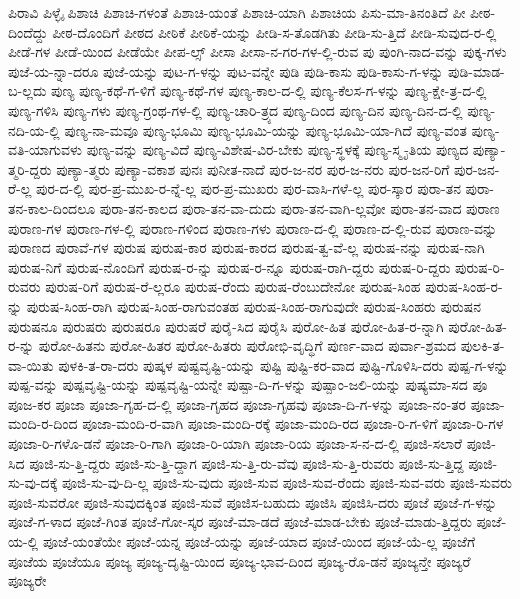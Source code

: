 {ಪಿರಾವಿ
ಪಿಳ್ಳೈ
ಪಿಶಾಚಿ
ಪಿಶಾಚಿ-ಗಳಂತೆ
ಪಿಶಾಚಿ-ಯಂತೆ
ಪಿಶಾಚಿ-ಯಾಗಿ
ಪಿಶಾಚಿಯ
ಪಿಸು-ಮಾ-ತಿನಂತಿದೆ
ಪೀ
ಪೀಠ-ದಿಂದೆದ್ದು
ಪೀಠ-ದೊಂದಿಗೆ
ಪೀಠದ
ಪೀಠಿಕೆ
ಪೀಠಿಕೆ-ಯನ್ನು
ಪೀಡಿ-ಸ-ತೊಡಗಿತು
ಪೀಡಿ-ಸು-ತ್ತಿದೆ
ಪೀಡಿ-ಸುವುದ-ರ-ಲ್ಲಿ
ಪೀಡೆ-ಗಳ
ಪೀಡೆ-ಯಿಂದ
ಪೀಡೆಯೇ
ಪೀಪ-ಲ್ಸ್
ಪೀಸಾ
ಪೀಸಾ-ನ-ಗರ-ಗಳ-ಲ್ಲಿ-ರುವ
ಪು
ಪುಂಗಿ-ನಾದ-ವನ್ನು
ಪುಕ್ಕ-ಗಳು
ಪುಜೆ-ಯ-ನ್ನಾ-ದರೂ
ಪುಜೆ-ಯನ್ನು
ಪುಟ-ಗ-ಳನ್ನು
ಪುಟ-ವನ್ನೇ
ಪುಡಿ
ಪುಡಿ-ಕಾಸು
ಪುಡಿ-ಕಾಸು-ಗ-ಳನ್ನು
ಪುಡಿ-ಮಾಡ-ಬ-ಲ್ಲದು
ಪುಣ್ಯ
ಪುಣ್ಯ-ಕಥೆ-ಗ-ಳಿಗೆ
ಪುಣ್ಯ-ಕಥೆ-ಗಳ
ಪುಣ್ಯ-ಕಾಲ-ದ-ಲ್ಲಿ
ಪುಣ್ಯ-ಕೆಲಸ-ಗ-ಳನ್ನು
ಪುಣ್ಯ-ಕ್ಷೇ-ತ್ರ-ದ-ಲ್ಲಿ
ಪುಣ್ಯ-ಗಳಿಸಿ
ಪುಣ್ಯ-ಗಳು
ಪುಣ್ಯ-ಗ್ರಂಥ-ಗಳ-ಲ್ಲಿ
ಪುಣ್ಯ-ಚಾರಿ-ತ್ರ್ಯದ
ಪುಣ್ಯ-ದಿಂದ
ಪುಣ್ಯ-ದಿನ
ಪುಣ್ಯ-ದಿನ-ದ-ಲ್ಲಿ
ಪುಣ್ಯ-ನದಿ-ಯ-ಲ್ಲಿ
ಪುಣ್ಯ-ನಾ-ಮವೂ
ಪುಣ್ಯ-ಭೂಮಿ
ಪುಣ್ಯ-ಭೂಮಿ-ಯನ್ನು
ಪುಣ್ಯ-ಭೂಮಿ-ಯಾ-ಗಿದೆ
ಪುಣ್ಯ-ವಂತ
ಪುಣ್ಯ-ವತಿ-ಯಾಗುವಳು
ಪುಣ್ಯ-ವನ್ನು
ಪುಣ್ಯ-ವಿದೆ
ಪುಣ್ಯ-ವಿಶೇಷ-ವಿರ-ಬೇಕು
ಪುಣ್ಯ-ಸ್ಥಳಕ್ಕೆ
ಪುಣ್ಯ-ಸ್ಮೃ-ತಿಯ
ಪುಣ್ಯದ
ಪುಣ್ಯಾ-ತ್ಮರಿ-ದ್ದರು
ಪುಣ್ಯಾ-ತ್ಮರು
ಪುಣ್ಯಾ-ವಕಾಶ
ಪುನಃ
ಪುನೀತ-ನಾದೆ
ಪುರ-ಜ-ನರ
ಪುರ-ಜ-ನರು
ಪುರ-ಜನ-ರಿಗೆ
ಪುರ-ಜನ-ರೆ-ಲ್ಲ
ಪುರ-ದ-ಲ್ಲಿ
ಪುರ-ಪ್ರ-ಮುಖ-ರ-ನ್ನೆ-ಲ್ಲ
ಪುರ-ಪ್ರ-ಮುಖರು
ಪುರ-ವಾಸಿ-ಗಳೆ-ಲ್ಲ
ಪುರ-ಸ್ಕಾರ
ಪುರಾ-ತನ
ಪುರಾ-ತನ-ಕಾಲ-ದಿಂದಲೂ
ಪುರಾ-ತನ-ಕಾಲದ
ಪುರಾ-ತನ-ವಾ-ದುದು
ಪುರಾ-ತನ-ವಾಗಿ-ಲ್ಲವೋ
ಪುರಾ-ತನ-ವಾದ
ಪುರಾಣ
ಪುರಾಣ-ಗಳ
ಪುರಾಣ-ಗಳ-ಲ್ಲಿ
ಪುರಾಣ-ಗಳಿಂದ
ಪುರಾಣ-ಗಳು
ಪುರಾಣ-ದ-ಲ್ಲಿ
ಪುರಾಣ-ದ-ಲ್ಲಿ-ರುವ
ಪುರಾಣ-ವನ್ನು
ಪುರಾಣದ
ಪುರಾವೆ-ಗಳ
ಪುರುಷ
ಪುರುಷ-ಕಾರ
ಪುರುಷ-ಕಾರದ
ಪುರುಷ-ತ್ವ-ವೆ-ಲ್ಲ
ಪುರುಷ-ನನ್ನು
ಪುರುಷ-ನಾಗಿ
ಪುರುಷ-ನಿಗೆ
ಪುರುಷ-ನೊಂದಿಗೆ
ಪುರುಷ-ರ-ನ್ನು
ಪುರುಷ-ರ-ನ್ನೂ
ಪುರುಷ-ರಾಗಿ-ದ್ದರು
ಪುರುಷ-ರಿ-ದ್ದರು
ಪುರುಷ-ರಿ-ರುವರು
ಪುರುಷ-ರಿಗೆ
ಪುರುಷ-ರೆ-ಲ್ಲರೂ
ಪುರುಷ-ರೆಂದು
ಪುರುಷ-ರೆಂಬುದೇನೋ
ಪುರುಷ-ಸಿಂಹ
ಪುರುಷ-ಸಿಂಹ-ರ-ನ್ನು
ಪುರುಷ-ಸಿಂಹ-ರಾಗಿ
ಪುರುಷ-ಸಿಂಹ-ರಾಗುವಂತಹ
ಪುರುಷ-ಸಿಂಹ-ರಾಗುವುದೇ
ಪುರುಷ-ಸಿಂಹರು
ಪುರುಷನ
ಪುರುಷನೂ
ಪುರುಷರು
ಪುರುಷರೂ
ಪುರುಷರೆ
ಪುರೈ-ಸಿದ
ಪುರೈಸಿ
ಪುರೋ-ಹಿತ
ಪುರೋ-ಹಿತ-ರ-ನ್ನಾಗಿ
ಪುರೋ-ಹಿತ-ರ-ನ್ನು
ಪುರೋ-ಹಿತನು
ಪುರೋ-ಹಿತರ
ಪುರೋ-ಹಿತರು
ಪುರೋಭಿ-ವೃದ್ಧಿಗೆ
ಪುರ್ಣ-ವಾದ
ಪುರ್ವಾ-ಶ್ರಮದ
ಪುಲಕಿ-ತ-ವಾ-ಯಿತು
ಪುಳಕಿ-ತ-ರಾ-ದರು
ಪುಷ್ಕಳ
ಪುಷ್ಟವೃಷ್ಟಿ-ಯನ್ನು
ಪುಷ್ಟಿ
ಪುಷ್ಟಿ-ಕರ-ವಾದ
ಪುಷ್ಟಿ-ಗೊಳಿಸಿ-ದರು
ಪುಷ್ಪ-ಗ-ಳನ್ನು
ಪುಷ್ಪ-ವನ್ನು
ಪುಷ್ಪವೃಷ್ಟಿ-ಯನ್ನು
ಪುಷ್ಪವೃಷ್ಟಿ-ಯನ್ನೇ
ಪುಷ್ಪಾ-ದಿ-ಗ-ಳನ್ನು
ಪುಷ್ಪಾಂ-ಜಲಿ-ಯನ್ನು
ಪುಷ್ಯಮಾ-ಸದ
ಪೂ
ಪೂಜ-ಕರ
ಪೂಜಾ
ಪೂಜಾ-ಗೃಹ-ದ-ಲ್ಲಿ
ಪೂಜಾ-ಗೃಹದ
ಪೂಜಾ-ಗೃಹವು
ಪೂಜಾ-ದಿ-ಗ-ಳನ್ನು
ಪೂಜಾ-ನಂ-ತರ
ಪೂಜಾ-ಮಂದಿ-ರ-ದಿಂದ
ಪೂಜಾ-ಮಂದಿ-ರ-ವಾಗಿ
ಪೂಜಾ-ಮಂದಿ-ರಕ್ಕೆ
ಪೂಜಾ-ಮಂದಿ-ರದ
ಪೂಜಾ-ರಿ-ಗ-ಳಿಗೆ
ಪೂಜಾ-ರಿ-ಗಳ
ಪೂಜಾ-ರಿ-ಗಳೊ-ಡನೆ
ಪೂಜಾ-ರಿ-ಗಾಗಿ
ಪೂಜಾ-ರಿ-ಯಾಗಿ
ಪೂಜಾ-ರಿಯ
ಪೂಜಾ-ಸ-ನ-ದ-ಲ್ಲಿ
ಪೂಜಿ-ಸಲಾರೆ
ಪೂಜಿ-ಸಿದ
ಪೂಜಿ-ಸು-ತ್ತಿ-ದ್ದರು
ಪೂಜಿ-ಸು-ತ್ತಿ-ದ್ದಾಗ
ಪೂಜಿ-ಸು-ತ್ತಿ-ರು-ವೆವು
ಪೂಜಿ-ಸು-ತ್ತಿ-ರುವರು
ಪೂಜಿ-ಸು-ತ್ತಿದ್ದ
ಪೂಜಿ-ಸು-ವು-ದಕ್ಕೆ
ಪೂಜಿ-ಸು-ವು-ದಿ-ಲ್ಲ
ಪೂಜಿ-ಸು-ವುದು
ಪೂಜಿ-ಸುವ
ಪೂಜಿ-ಸುವ-ರೆಂದು
ಪೂಜಿ-ಸುವ-ವರು
ಪೂಜಿ-ಸುವರು
ಪೂಜಿ-ಸುವರೋ
ಪೂಜಿ-ಸುವುದಕ್ಕಿಂತ
ಪೂಜಿ-ಸುವೆ
ಪೂಜಿಸ-ಬಹುದು
ಪೂಜಿಸಿ
ಪೂಜಿಸಿ-ದರು
ಪೂಜೆ
ಪೂಜೆ-ಗ-ಳನ್ನು
ಪೂಜೆ-ಗ-ಳಾದ
ಪೂಜೆ-ಗಿಂತ
ಪೂಜೆ-ಗೋ-ಸ್ಕರ
ಪೂಜೆ-ಮಾ-ಡದೆ
ಪೂಜೆ-ಮಾಡ-ಬೇಕು
ಪೂಜೆ-ಮಾಡು-ತ್ತಿದ್ದರು
ಪೂಜೆ-ಯ-ಲ್ಲಿ
ಪೂಜೆ-ಯಂತೆಯೇ
ಪೂಜೆ-ಯನ್ನ
ಪೂಜೆ-ಯನ್ನು
ಪೂಜೆ-ಯಾದ
ಪೂಜೆ-ಯಿಂದ
ಪೂಜೆ-ಯೆ-ಲ್ಲ
ಪೂಜೆಗೆ
ಪೂಜೆಯ
ಪೂಜೆಯೂ
ಪೂಜ್ಯ
ಪೂಜ್ಯ-ದೃಷ್ಟಿ-ಯಿಂದ
ಪೂಜ್ಯ-ಭಾವ-ದಿಂದ
ಪೂಜ್ಯ-ರೊ-ಡನೆ
ಪೂಜ್ಯನ್ತೇ
ಪೂಜ್ಯರೆ
ಪೂಜ್ಯರೇ
}
